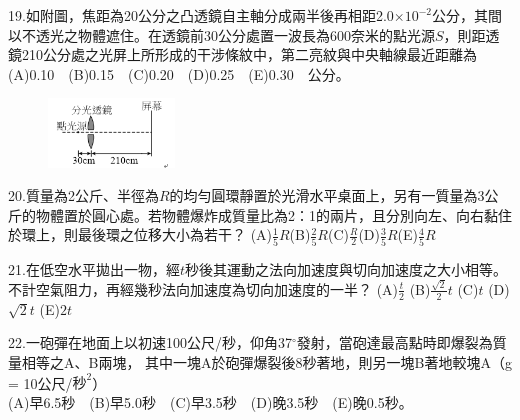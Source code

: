 \documentclass[cn,10pt,math=newtx,chinesefont=founder,device=ig]{elegantbook}
\begin{document}
\begin{example}
   19.如附圖，焦距為20公分之凸透鏡自主軸分成兩半後再相距2.0$\times10^{-2}$公分，其間以不透光之物體遮住。在透鏡前30公分處置一波長為600奈米的點光源$S$，則距透鏡210公分處之光屏上所形成的干涉條紋中，第二亮紋與中央軸線最近距離為
   (A)0.10　(B)0.15　(C)0.20　(D)0.25　(E)0.30　公分。
   \\
    \rightline{[成德高中教甄109]}
\end{example}
\begin{solution}
    
\end{solution}
\begin{figure}[htbp]
    \flushright
    \includegraphics[width=0.3\textwidth]{image/109成德19.png}
  \end{figure}
\newpage

\begin{example}
   20.質量為2公斤、半徑為$R$的均勻圓環靜置於光滑水平桌面上，另有一質量為3公斤的物體置於圓心處。若物體爆炸成質量比為2：1的兩片，且分別向左、向右黏住於環上，則最後環之位移大小為若干？
   (A)$\frac{1}{5}R$(B)$\frac{2}{5}R$(C)$\frac{R}{2}$(D)$\frac{3}{5}R$(E)$\frac{4}{5}R$
   \\
    \rightline{[成德高中教甄109]}
\end{example}
\begin{solution}
    
\end{solution}

\newpage


\begin{example}
   21.在低空水平拋出一物，經$t$秒後其運動之法向加速度與切向加速度之大小相等。不計空氣阻力，再經幾秒法向加速度為切向加速度的一半？
   (A)$\frac{t}{2}$ (B)$\frac{\sqrt{2}}{2}t$ (C)$t$ (D)$\sqrt{2}t$ (E)$2t$
   \\
    \rightline{[成德高中教甄109]}
\end{example}
\begin{solution}
    
\end{solution}

\newpage


\begin{example}
   22.一砲彈在地面上以初速100公尺/秒，仰角37$^\circ$發射，當砲達最高點時即爆裂為質量相等之A、B兩塊，
   其中一塊A於砲彈爆裂後8秒著地，則另一塊B著地較塊A（g = 10公尺/$秒^2$）\\
   (A)早6.5秒　(B)早5.0秒　(C)早3.5秒　(D)晚3.5秒　(E)晚0.5秒。
   \\
    \rightline{[成德高中教甄109]}
\end{example}
\begin{solution}
    
\end{solution}
\end{document}
